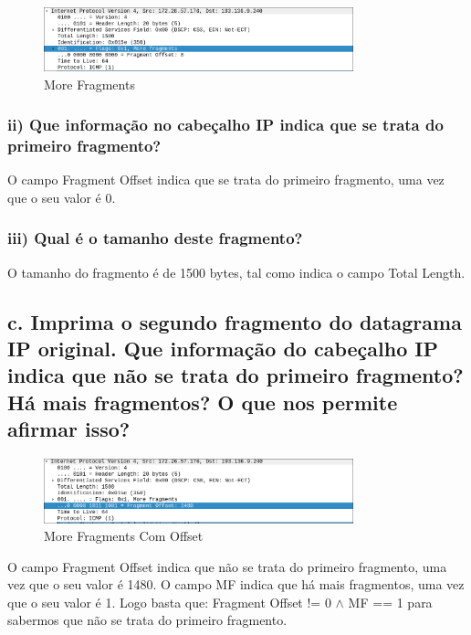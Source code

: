 \documentclass{article}
\begin{document}
\begin{figure}[h]
    \centering
    \includegraphics[width=0.8\textwidth]{images/mf.png}
    \caption{\label{fig:more_fragments}More Fragments}
\end{figure}

\subsubsection*{ii) Que informação
no cabeçalho IP indica que se trata do primeiro fragmento?}

O campo Fragment Offset indica que se trata do primeiro fragmento, uma vez que o seu valor é 0.

\subsubsection*{iii) Qual é o tamanho deste fragmento?}

O tamanho do fragmento é de 1500 bytes, tal como indica o campo Total Length.

\subsection*{c. Imprima o segundo fragmento do datagrama IP original. Que informação
do cabeçalho IP indica que não se trata do primeiro fragmento? Há mais
fragmentos? O que nos permite afirmar isso?}

\begin{figure}[h]
    \centering
    \includegraphics[width=0.8\textwidth]{images/mf_offset.png}
    \caption{\label{fig:more_fragments_offset}More Fragments Com Offset}
\end{figure}

O campo Fragment Offset indica que não se trata do primeiro fragmento, uma vez que o seu valor é 1480. O campo MF indica que há mais fragmentos, uma vez que o seu valor é 1.
Logo basta que: Fragment Offset != 0 $\wedge$ MF == 1 para sabermos que não se trata do primeiro fragmento.
\end{document}

